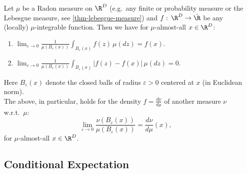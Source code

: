 \begin{Thm}
    \label{besicovitch-density}
Let $\mu$ be a Radon measure on $\R^D$ (e.g.\ any finite or probability measure or the Lebesgue measure, see \ref{thm-lebesgue-measure}) and $f:\,\R^D \to \bar\R$ be any (locally) $\mu$-integrable function.
    Then we have for $\mu$-almost-all $x \in \R^D$:
    \begin{enumerate}
        \item $\displaystyle \lim_{\varepsilon \to 0} \frac{1}{\mu( B_\varepsilon(x))} \int_{B_\varepsilon(x)}f(z)\,\mu(dz) = f(x).$   
        \item $\displaystyle \lim_{\varepsilon \to 0} \frac{1}{\mu( B_\varepsilon(x))} \int_{B_\varepsilon(x)}|f(z) - f(x)|\,\mu(dz) = 0$. 
    \end{enumerate}
    Here $B_\varepsilon(x)$ denote the closed balls of radius $\varepsilon>0$ centered at $x$ (in Euclidean norm).\\
    The above, in particular, holds for the density $f=\frac{d\nu}{d\mu}$ of another measure $\nu$ w.r.t.\ $\mu$:
    \[  \lim_{\varepsilon \to 0} \frac{\nu( B_\varepsilon(x))} {\mu( B_\varepsilon(x))}  = \frac{d\nu}{d\mu}(x), \]
    for $\mu$-almost-all $x \in \R^D$.
\end{Thm}

\subsection{Conditional Expectation}

